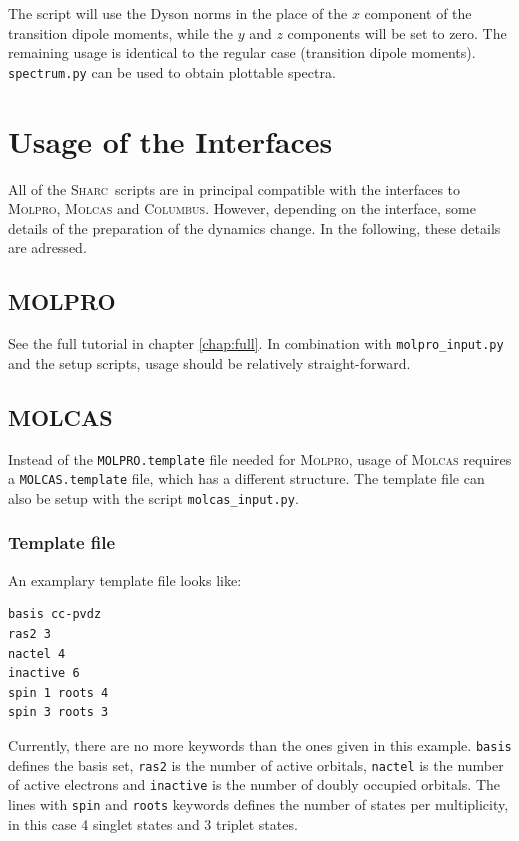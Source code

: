\documentclass[a4paper,11pt,DIV=15,openany]{scrbook}
\newcommand{\sharc}{\textsc{Sharc}}
\newcommand{\ttt}[1]{\texttt{#1}}
\begin{document}
\normalsize
The script will use the Dyson norms in the place of the $x$ component of the transition dipole moments, while the $y$ and $z$ components will be set to zero. The remaining usage is identical to the regular case (transition dipole moments). \ttt{spectrum.py} can be used to obtain plottable spectra.

\chapter{Usage of the Interfaces}

All of the \sharc\ scripts are in principal compatible with the interfaces to \textsc{Molpro}, \textsc{Molcas} and \textsc{Columbus}. However, depending on the interface, some details of the preparation of the dynamics change. In the following, these details are adressed.

\section{MOLPRO}

See the full tutorial in chapter \ref{chap:full}. In combination with \ttt{molpro\_input.py} and the setup scripts, usage should be relatively straight-forward.

\section{MOLCAS}

Instead of the \ttt{MOLPRO.template} file needed for \textsc{Molpro}, usage of \textsc{Molcas} requires a \ttt{MOLCAS.template} file, which has a different structure. The template file can also be setup with the script \ttt{molcas\_input.py}.

\subsection{Template file}

An examplary template file looks like:
\begin{oframed}
\footnotesize\begin{Verbatim}[commandchars=\\\{\}]
basis cc-pvdz
ras2 3
nactel 4
inactive 6
spin 1 roots 4
spin 3 roots 3
\end{Verbatim}
\end{oframed}

Currently, there are no more keywords than the ones given in this example. \ttt{basis} defines the basis set, \ttt{ras2} is the number of active orbitals, \ttt{nactel} is the number of active electrons and \ttt{inactive} is the number of doubly occupied orbitals. 
The lines with \ttt{spin} and \ttt{roots} keywords defines the number of states per multiplicity, in this case 4 singlet states and 3 triplet states.
\end{document}
